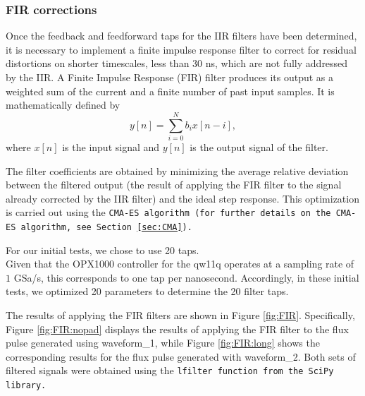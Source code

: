 \subsubsection{FIR corrections}
Once the feedback and feedforward taps for the IIR filters have been determined, it is necessary to implement a finite impulse response filter to correct for residual distortions on shorter timescales, less than 30 ns, which are not fully addressed by the IIR.
A Finite Impulse Response (FIR) filter produces its output as a weighted sum of the current and a finite number of past input samples. It is mathematically defined by
\begin{equation}
        y[n] = \sum_{i=0}^{N} b_i x[n - i],
\end{equation}
where $x[n]$ is the input signal and $y[n]$ is the output signal of the filter.

The filter coefficients are obtained by minimizing the average relative deviation between the filtered output (the result of applying the FIR filter to the signal already corrected by the IIR filter) and the ideal step response. 
This optimization is carried out using the \tt{CMA-ES} algorithm (for further details on the \tt{CMA-ES} algorithm, see Section \ref{sec:CMA}).

For our initial tests, we chose to use 20 taps.\\
Given that the OPX1000 controller for the qw11q operates at a sampling rate of $1$ GSa/s, this corresponds to one tap per nanosecond. 
Accordingly, in these initial tests, we optimized 20 parameters to determine the 20 filter taps.

The results of applying the FIR filters are shown in Figure \ref{fig:FIR}. 
Specifically, Figure \ref{fig:FIR:nopad} displays the results of applying the FIR filter to the flux pulse generated using waveform\_1, while Figure \ref{fig:FIR:long} shows the corresponding results for the flux pulse generated with waveform\_2. 
Both sets of filtered signals were obtained using the \tt{lfilter} function from the \tt{SciPy} library.

